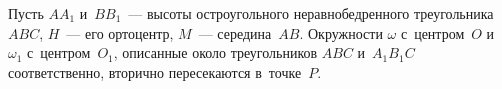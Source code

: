



Пусть $A A_1$ и~$B B_1$~--- высоты остроугольного неравнобедренного
треугольника $ABC$, $H$~--- его ортоцентр, $M$~--- середина~$AB$.
Окружности $\omega$ с~центром~$O$ и~$\omega_1$ с~центром~$O_1$, описанные около
треугольников $ABC$ и~$A_1 B_1 C$ соответственно, вторично пересекаются
в~точке~$P$.

